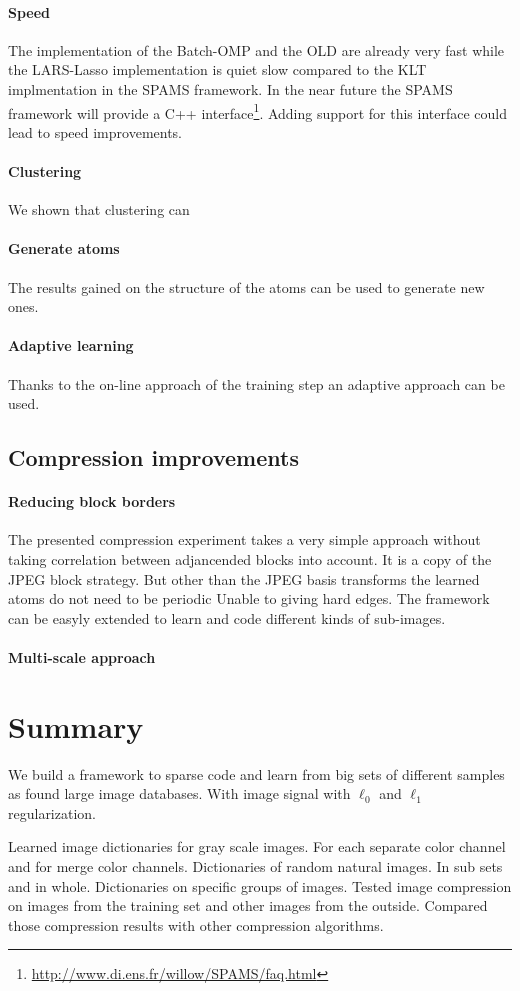 \paragraph{Speed}
The implementation of the Batch-OMP and the OLD are already very fast while the
LARS-Lasso implementation is quiet slow compared to the KLT implmentation in the
SPAMS framework. In the near future the SPAMS framework will provide a C++
interface\footnote{\url{http://www.di.ens.fr/willow/SPAMS/faq.html}}. Adding
support for this interface could lead to speed improvements.

\paragraph{Clustering}
We shown that clustering can 

\paragraph{Generate atoms}
The results gained on the structure of the atoms can be used to generate new
ones.
\paragraph{Adaptive learning}
Thanks to the on-line approach of the training step an adaptive approach can be
used. 


\subsection{Compression improvements}
\paragraph{Reducing block borders} The presented compression experiment
takes a very simple approach without taking correlation between adjancended
blocks into account. It is a copy of the JPEG block strategy. But other than
the JPEG basis transforms the learned atoms do not need to be periodic
Unable to giving
hard edges. The framework can be easyly extended to learn and code different
kinds of sub-images.

\paragraph{Multi-scale approach}



\section{Summary} 
We build a framework to sparse code and learn from big sets of different samples
as found large image databases. With image signal with $\ell_0$ and $\ell_1$
regularization. 

Learned image dictionaries for gray scale images. For
each separate color channel and for merge color channels. Dictionaries of
random natural images. In sub sets and in whole. Dictionaries on specific
groups of images. 
Tested image compression on images from the training set and other images from
the outside. Compared those compression results with other compression
algorithms.


